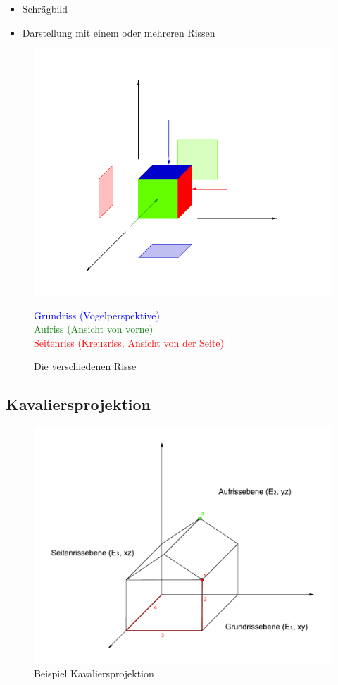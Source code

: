 \documentclass[12pt,a4paper]{scrbook}
\begin{document}
\begin{itemize}
  \item Schrägbild
  \item Darstellung mit einem oder mehreren Rissen
\end{itemize}

\begin{figure}[h]
  \centering
  \includegraphics[scale=1]{img/DGeinfuehrung.pdf}
  \caption{Die verschiedenen Risse}
  \textcolor{blue}{Grundriss (Vogelperspektive)}\\
  \textcolor{green}{Aufriss (Ansicht von vorne)}\\
  \textcolor{red}{Seitenriss (Kreuzriss, Ansicht von der Seite)}
\end{figure}


\subsection{Kavaliersprojektion}
\begin{figure}[h]
  \centering
  \includegraphics[scale=0.8]{img/DGeinfuehrung_2.pdf}
  \caption{Beispiel Kavaliersprojektion}
\end{figure}
\end{document}
